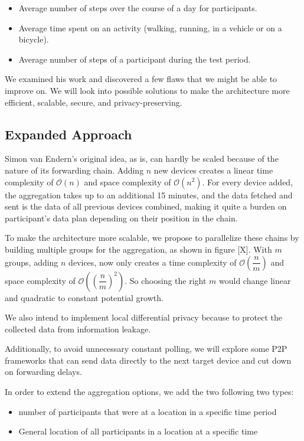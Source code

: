 \begin{itemize}
    \item Average number of steps over the course of a day for participants. 
    \item Average time spent on an activity (walking, running, in a vehicle or on a bicycle).
    \item Average number of steps of a participant during the test period. 
\end{itemize}

We examined his work and discovered a few flaws that we might be able to improve on. We will look into possible solutions to make the architecture more efficient, scalable, secure, and privacy-preserving. 

\subsection{Expanded Approach}
Simon van Endern's original idea, as is, can hardly be scaled because of the nature of its forwarding chain. Adding \(n\) new devices creates a linear time complexity of \(\mathcal{O}(n)\) and space complexity of \(\mathcal{O}(n^2)\). For every device added, the aggregation takes up to an additional 15 minutes, and the data fetched and sent is the data of all previous devices combined, making it quite a burden on participant's data plan depending on their position in the chain. 

To make the architecture more scalable, we propose to parallelize these chains by building multiple groups for the aggregation, as shown in figure [X]. With \(m\) groups, adding \(n\) devices, now only creates a time complexity of \(\mathcal{O}(\dfrac{n}{m})\) and space complexity of \(\mathcal{O}((\dfrac{n}{m})^2)\). So choosing the right \(m\) would change linear and quadratic to constant potential growth. 

We also intend to implement local differential privacy because to protect the collected data from information leakage.

Additionally, to avoid unnecessary constant polling, we will explore some P2P frameworks that can send data directly to the next target device and cut down on forwarding delays.

In order to extend the aggregation options, we add the two following two types:
\begin{itemize}
    \item number of participants that were at a location in a specific time period
    \item General location of all participants in a location at a specific time
\end{itemize}

